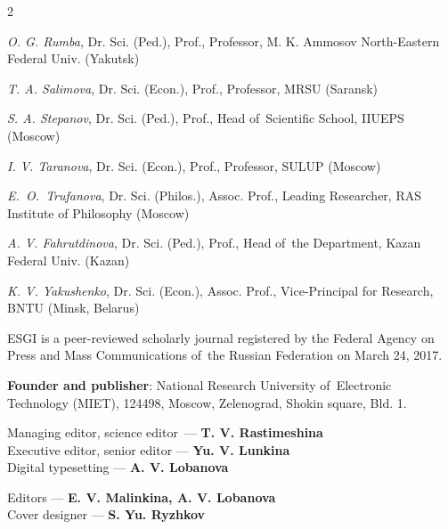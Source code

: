\begin{otherlanguage}{english}
\begin{multicols}{2}
\begin{flushleft}
\noindent \textit{O. G. Rumba}, Dr. Sci. (Ped.), Prof., Professor, M. K. Ammosov North-Eastern Federal Univ. (Yakutsk)

\noindent \textit{T. A. Salimova}, Dr. Sci. (Econ.), Prof., Professor, MRSU (Saransk)

\noindent \textit{S. A. Stepanov}, Dr. Sci. (Ped.), Prof., Head of Scientific School, IIUEPS (Moscow)

\noindent \textit{I. V. Taranova}, Dr. Sci. (Econ.), Prof., Professor, SULUP (Moscow)

\noindent \textit{E. O. Trufanova}, Dr. Sci. (Philos.), Assoc. Prof., Leading Researcher, RAS Institute of Philosophy (Moscow)

\noindent \textit{A. V. Fahrutdinova}, Dr. Sci. (Ped.), Prof., Head of the Department, Kazan Federal Univ. (Kazan)



\noindent \textit{K. V. Yakushenko}, Dr. Sci. (Econ.), Assoc. Prof., Vice-Principal for Research, BNTU (Minsk, Belarus)

   \end{flushleft}    
\end{multicols}

\begin{flushleft}
\scriptsize
ESGI is a peer-reviewed scholarly journal registered by the Federal Agency on Press and Mass Communications
of the Russian Federation on March 24, 2017.

\vspace{1em}
\textbf{Founder and publisher}: National Research University of Electronic Technology (MIET), 124498, Moscow,
Zelenograd, Shokin square, Bld. 1.
\end{flushleft}

\noindent
\begin{minipage}[t]{.48\textwidth}
    
\begin{flushleft}
  \scriptsize
Managing editor, science editor — \textbf{T. V. Rastimeshina}\\
Executive editor, senior editor — \textbf{Yu. V. Lunkina} \\
Digital typesetting — \textbf{A. V. Lobanova}
    \end{flushleft}
\end{minipage}\hspace{0.04\textwidth}
\begin{minipage}[t]{.48\textwidth}
    \begin{flushleft}
        \scriptsize
        Editors — \textbf{E. V. Malinkina, A. V. Lobanova}\\
        Cover designer — \textbf{S. Yu. Ryzhkov}
    \end{flushleft}
\end{minipage}


\end{otherlanguage}
